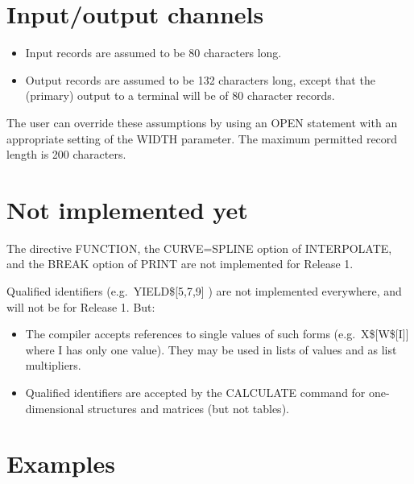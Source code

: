 \section{Input/output channels}
\begin{itemize}
\item Input records are assumed to be 80 characters long.
\item Output records are assumed to be 132 characters long, except that the
 (primary) output to a terminal will be of 80 character records.
\end{itemize}
The user can override these assumptions by using an OPEN statement with
an appropriate setting of the WIDTH parameter.
The maximum permitted record length is 200 characters.

\section{Not implemented yet}

The directive FUNCTION, the CURVE=SPLINE option of INTERPOLATE,
and the BREAK option of PRINT are not implemented for Release 1.

Qualified identifiers (e.g.\ YIELD\$[5,7,9] ) are not implemented everywhere,
and will not be for Release 1. But:
\begin{itemize}
\item The compiler accepts references to single values of such forms
 (e.g.\ X\$[W\$[I]] where I has only one value).
 They may be used in lists of values and as list multipliers.
\item Qualified identifiers are accepted by the CALCULATE command for
 one-dimensional structures and matrices (but not tables).
\end{itemize}

\section{Examples}

